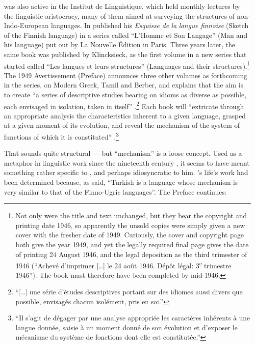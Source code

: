 \documentclass[output=paper]{langscibook}
\begin{document}
{\Sauvageot} was also active in the Institut de Linguistique, which held monthly lectures by the linguistic aristocracy, many of them aimed at surveying the structures of non-Indo-European languages. In \citeyear{Sauvageot1946} {\Sauvageot} published his \emph{Esquisse de la langue finnoise} (Sketch of the Finnish language) in a series called ``L’Homme et Son Langage'' (Man and his language) put out by La Nouvelle Édition in Paris. Three years later, the same book was published by Klincksieck, as the first volume in a new series that {\Sauvageot} started called ``Les langues et leurs structures'' (Languages and their structures).\footnote{Not only were the title and text unchanged, but they bear the copyright and printing date 1946, so apparently the unsold copies were simply given a new cover with the fresher date of 1949. Curiously, the cover and copyright page both give the year 1949, and yet the legally required final page gives the date of printing 24 August 1946, and the legal deposition as the third trimester of 1946 (``Achevé d'imprimer […] le 24 août 1946. Dépôt légal: 3\textsuperscript{e} trimestre 1946''). The book must therefore have been completed by mid-1946.} The 1949 Avertissement (Preface) announces three other volumes as forthcoming in the series, on Modern Greek, Tamil and Berber, and explains that the aim is to create ``a series of descriptive studies bearing on idioms as diverse as possible, each envisaged in isolation, taken in itself'' \citep[7]{Sauvageot1946}.\footnote{``[…] une série d'études descriptives portant sur des idiomes aussi divers que possible, envisagés chacun isolément, pris en soi.''} Each book will ``extricate through an appropriate analysis the characteristics inherent to a given language, grasped at a given moment of its evolution, and reveal the mechanism of the system of functions of which it is constituted'' \citep[7]{Sauvageot1946}.\footnote{``Il s'agit de dégager par une analyse appropriée les caractères inhérents à une langue donnée, saisie à un moment donné de son évolution et d'exposer le mécanisme du système de fonctions dont elle est constitutée.''}

That sounds quite structural — but ``mechanism'' is a loose concept. Used as a metaphor in linguistic work since the nineteenth century \citep[see][]{Joseph2018hj}, it seems to have meant something rather specific to {\Sauvageot}, and perhaps idiosyncratic to him. {\Sauvageot}'s life's work had been determined because, as {\Meillet} said, ``Turkish is a language whose mechanism is very similar to that of the Finno-Ugric languages''. The Preface continues:
 
\end{document}
